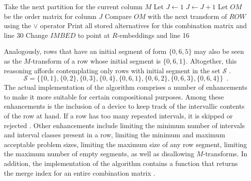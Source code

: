 \setlength{\interspacetitleruled}{0pt}%
\setlength{\algotitleheightrule}{0pt}%

\begin{algorithm2e}
\DontPrintSemicolon
\setcounter{AlgoLine}{39}
Take the next partition for the current column $M$\;
Let $J \gets 1$\;
$J \gets J + 1$\;
Let $OM$ be the order matrix for column $J$\;
Compare $OM$ with the next transform of $ROW$ using the $\lor$ operator\;
Print all stored alternatives for this combination matrix and \KwGoTo line 30\;
Change $IMBED$ to point at $R$-embeddings and \KwGoTo line 16\;
\end{algorithm2e}

\noindent Analogously, rows that have an initial segment of form $\{0, 6, 5\}$ may also be seen as the $M$-transform of a row whose initial segment is $\{0, 6, 1\}$. Altogether, this reasoning affords contemplating only rows with initial segment in the set $\mathcal{S}$ \cite[35]{Kowalski1987b}.
\begin{equation}
	\label{eq:initial-segment}
	\mathcal{S} = \{\{0, 1\}, \{0, 2\}, \{0, 3\}, \{0, 4\}, \{0, 6, 1\}, \{0, 6, 2\}, \{0, 6, 3\}, \{0, 6, 4\}\} \enspace.
\end{equation}
\noindent The actual implementation of the algorithm comprises a number of enhancements to make it more suitable for certain compositional purposes. Among these enhancements is the inclusion of a device to keep track of the intervallic contents of the row at hand. If a row has too many repeated intervals, it is skipped or rejected \cite[37]{Kowalski1987b}. Other enhancements include limiting the minimum number of intervals and interval classes present in a row, limiting the minimum and maximum acceptable problem sizes, limiting the maximum size of any row segment, limiting the maximum number of empty segments, as well as disallowing $M$-transforms. In addition, the implementation of the algorithm contains a function that returns the merge index for an entire combination matrix \cite[38]{Kowalski1987b}.

